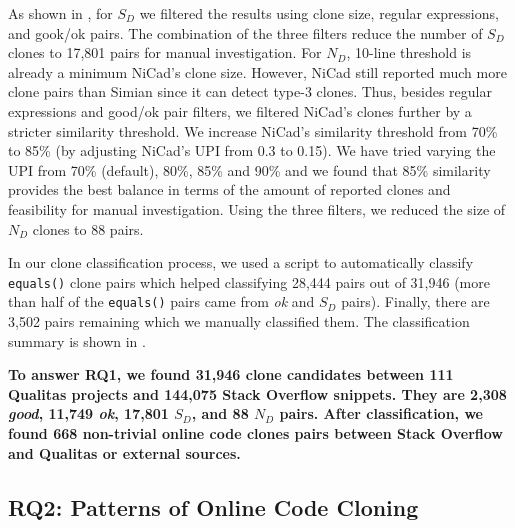 \documentclass[sigconf,review, anonymous]{acmart}
\begin{document}
As shown in , for $S_D$ we filtered the results using clone size, regular expressions, and gook/ok pairs. The combination of the three filters reduce the number of $S_D$ clones to 17,801 pairs for manual investigation. 
For $N_D$, 10-line threshold is already a minimum NiCad's clone size. However, NiCad still reported much more clone pairs than Simian since it can detect type-3 clones. Thus, besides regular expressions and good/ok pair filters, we filtered NiCad's clones further by a stricter similarity threshold. We increase NiCad's similarity threshold from 70\% to 85\% (by adjusting NiCad's $\mathrm{UPI}$ from 0.3 to 0.15). We have tried varying the UPI from 70\% (default), 80\%, 85\% and 90\% and we found that 85\% similarity provides the best balance in terms of the amount of reported clones and feasibility for manual investigation. Using the three filters, we reduced the size of $N_D$ clones to 88 pairs.

In our clone classification process, we used a script to automatically classify {\small\texttt{equals()}} clone pairs which helped classifying 28,444 pairs out of 31,946 (more than half of the {\small\texttt{equals()}} pairs came from \textit{ok} and $S_D$ pairs). Finally, there are 3,502 pairs remaining which we manually classified them. The classification summary is shown in .

\textbf{To answer RQ1, we found 31,946 clone candidates between 111 Qualitas projects and 144,075 Stack Overflow snippets. They are 2,308 \textit{good}, 11,749 \textit{ok}, 17,801 $S_D$, and 88 $N_D$ pairs. After classification, we found 668 non-trivial online code clones pairs between Stack Overflow and Qualitas or external sources.}

\subsection{RQ2: Patterns of Online Code Cloning}
\end{document}

